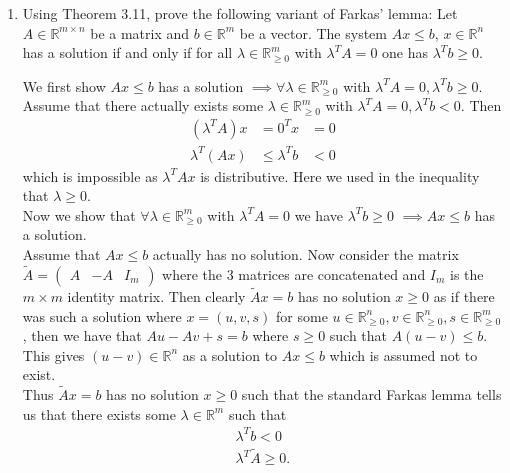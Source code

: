 \documentclass[11pt]{article}
\institute{\'Ecole Polytechnique F\'ed\'erale de Lausanne}
\newcommand{\setR}{\mathbb{R}}
\renewcommand{\leq}{\leqslant}
\renewcommand{\geq}{\geqslant}
\begin{document}
\makeheader

\begin{enumerate}[1)]

\item Using Theorem 3.11, prove the following variant of Farkas' lemma:
  Let $A\in\setR^{m\times n}$ be a matrix and $b\in\setR^m$ be a vector.
  The system $Ax \leq b$, $x\in\setR^n$ has a solution if and only if
  for all $\lambda\in\setR^m_{\geq0}$ with $\lambda^T A = 0$ one has $\lambda^T b \geq 0$.
  
  
  \begin{solution}
  We first show $Ax \leq b$ has a solution $\implies \forall \lambda \in \mathbb{R}^m_{\geq 0}$ with $\lambda^T A = 0, \lambda^Tb \geq 0$.  \\
  
  Assume that there actually exists some $\lambda \in \setR^m_{\geq 0}$ with $\lambda^TA = 0, \lambda^T b <0$. 
  Then 
  \begin{align*}
  (\lambda^T A)x & = 0^T x & = 0\\
  \lambda^T (Ax) & \leq \lambda^T b & < 0 
  \end{align*}
  which is impossible as  $\lambda^T Ax$ is distributive. Here we used in the inequality that $\lambda \geq 0$. \\
  
  Now we show that  $ \forall \lambda \in \mathbb{R}^m_{\geq 0}$ with $\lambda^T A = 0$ we have $\lambda^Tb \geq 0$ $\implies Ax \leq b$ has a solution. \\
  
  Assume that $Ax \leq b$ actually has no solution. Now consider the matrix $\tilde{A} = \begin{pmatrix} A & -A & I_m\end{pmatrix}$ where the 3 matrices are concatenated and $I_m$ is the $m \times m$ identity matrix. Then clearly $\tilde{A}x= b$ has no solution $x \geq 0$ as if there was such a solution where $x = (u, v, s)$ for some $u \in \setR_{\geq 0}^n, v \in \setR_{\geq 0}^n, s \in \setR_{\geq 0}^m$, then we have that $Au - Av + s = b$ where $s \geq 0$ such that $A(u-v) \leq b$. This gives $(u-v) \in \setR^n$ as a solution to $Ax \leq b$ which is assumed not to exist. \\
  
  Thus $\tilde{A}x = b$ has no solution $x \geq 0$ such that the standard Farkas lemma tells us that there exists some $\lambda \in \setR^m$ such that 
  \begin{align*}
  \lambda^Tb <0 \\
  \lambda^T \tilde{A} \geq 0.
  \end{align*}
  

\end{solution}
\end{enumerate}
\end{document}
